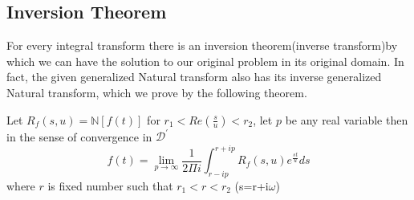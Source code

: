  \subsection{Inversion Theorem}
 For every integral transform there is an inversion theorem(inverse transform)by which we can have the solution to our original problem in its original domain. In fact, the given generalized Natural transform also has its inverse generalized Natural transform, which we prove by the following theorem.
 \begin{theorem}
 Let $R_{f}(s,u)=\mathbb{N}[f(t)]$ for $r_{1}<Re(\frac{s}{u})<r_{2}$, let $p$ be any real variable then in the sense of convergence in $\mathcal{D}^{'}$\\
 \begin{equation}
 f(t)= \underset{p\rightarrow\infty}\lim \frac{1}{2\Pi i}\int_{r-ip}^{r+ip}R_{f}(s,u)e^{\frac{st}{u}}ds
 \end{equation}
 where $r$ is fixed number such that $r_{1}<r<r_{2}$ (s=r+i$\omega$)
 \end{theorem}
